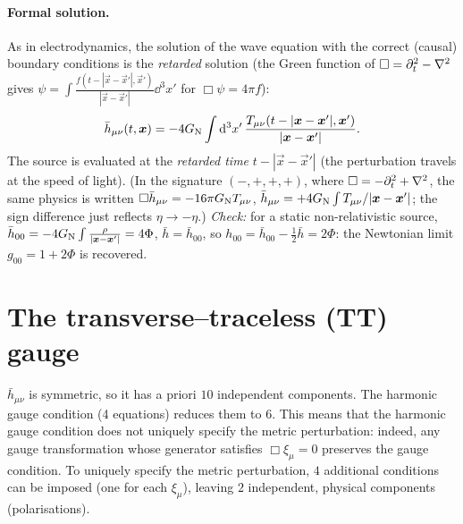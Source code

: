 \paragraph{Formal solution.} As in electrodynamics, the solution of the wave equation with the correct (causal) boundary conditions is the \emph{retarded} solution (the Green function of $\square=\partial_t^2-\nabla^2$ gives $\psi=\int\frac{f(t-|\vec x-\vec x'|,\vec x')}{|\vec x-\vec x'|}\dd^3x'$ for $\Box\psi=4\pi f$):
\begin{equation}
  \bar h_{\mu\nu}(t,\bm{x})=-4G_{\mathrm N}\int\mathrm{d}^3x'\,\frac{T_{\mu\nu}(t-|\bm{x}-\bm{x}'|,\bm{x}')}{|\bm{x}-\bm{x}'|}.
  \label{eq:retarded}
\end{equation}
The source is evaluated at the \emph{retarded time} $t-|\vec x-\vec x'|$ (the perturbation travels at the speed of light). (In the signature $(-,+,+,+)$, where $\square=-\partial_t^2+\nabla^2$, the same physics is written $\square\bar h_{\mu\nu}=-16\pi G_{\mathrm N} T_{\mu\nu}$, $\bar h_{\mu\nu}=+4G_{\mathrm N}\int T_{\mu\nu}/|\bm{x}-\bm{x}'|$; the sign difference just reflects $\eta\to-\eta$.) \textit{Check:} for a static non-relativistic source, $\bar h_{00}=-4G_{\mathrm N}\int\frac{\rho}{|\bm{x}-\bm{x}'|}=4\Phi$, $\bar h=\bar h_{00}$, so $h_{00}=\bar h_{00}-\frac12\bar h=2\Phi$: the Newtonian limit $g_{00}=1+2\Phi$ is recovered.

\section{The transverse--traceless (TT) gauge}

$\bar h_{\mu\nu}$ is symmetric, so it has a priori $10$ independent components. The harmonic gauge condition (4 equations) reduces them to $6$. This means that the harmonic gauge condition does not uniquely specify the metric perturbation: indeed, any gauge transformation whose generator satisfies $\Box\xi_\mu=0$ preserves the gauge condition. To uniquely specify the metric perturbation, $4$ additional conditions can be imposed (one for each $\xi_\mu$), leaving $\boxed{2}$ independent, physical components (polarisations).

